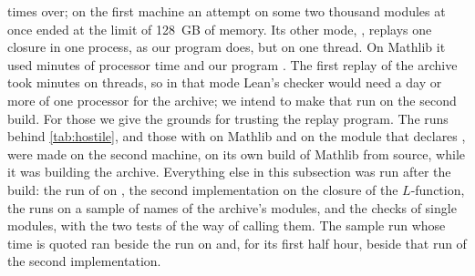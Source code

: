 times over; on the first machine an attempt on some two thousand modules at once ended at
the limit of 128~GB of memory. Its other mode, , replays one closure in one
process, as our program does, but on one thread. On Mathlib it used
\stockfreshmathlibcpuminutes{} minutes of processor time and our program
\stockreplaymathlibcpuminutes{}. The first replay of the archive took \replayminutes{}
minutes on \firstreplaythreads{} threads, so in that mode Lean's checker would need a day or
more of one processor for the archive; we intend to make that run on the second build.
\fi
For those we give the grounds for trusting the replay program. The runs behind
\cref{tab:hostile}, and those with 
on Mathlib and on the module that declares , were made on the second
machine, on its own build of Mathlib from source, while it was building the archive.
Everything else in this subsection was run after the build: the run of
 on , the second implementation on the closure of the $L$-function, the
runs on a sample of names of the archive's modules, and the checks of single modules, with
the two tests of the way of calling them. The sample run whose time is quoted ran beside
the run on  and, for its first half hour, beside that run of the second
implementation.

